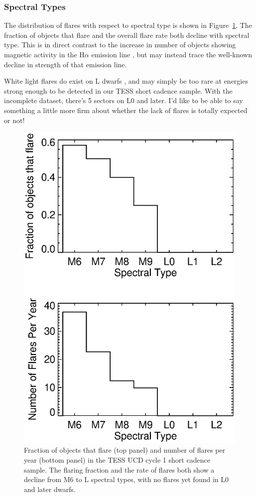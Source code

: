 \documentclass[twocolumn]{aastex62}
\begin{document}
\subsubsection{Spectral Types}
The distribution of flares with respect to spectral type is shown in Figure~\ref{fig:stflare}. The fraction of objects that flare and the overall flare rate both decline with spectral type. This is in direct contrast to the increase in number of objects showing magnetic activity in the H$\alpha$ emission line \citep{Schmidt2015}, but may instead trace the well-known decline in strength of that emission line. 

White light flares do exist on L dwarfs \citep{Schmidt2016a,Paudel2017}, and may simply be too rare at energies strong enough to be detected in our TESS short cadence sample. With the incomplete dataset, there's 5 sectors on L0 and later. I'd like to be able to say something a little more firm about whether the lack of flares is totally expected or not! 

\citep{Schmidt2015}
\begin{figure}
	\includegraphics[width=\columnwidth]{flare_stats.eps}
    \caption{Fraction of objects that flare (top panel) and number of flares per year (bottom panel) in the TESS UCD cycle 1 short cadence sample. The flaring fraction and the rate of flares both show a decline from M6 to L spectral types, with no flares yet found in L0 and later dwarfs.}
    \label{fig:stflare}
\end{figure}
\end{document}
